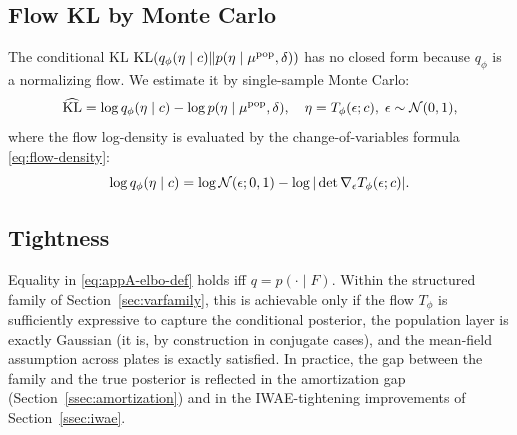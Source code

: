 \subsection*{Flow KL by Monte Carlo}
The conditional KL $\mathrm{KL}(q_\phi(\eta\mid c)\|p(\eta\mid\mu^{\mathrm{pop}},\delta))$ has no closed form because $q_\phi$ is a normalizing flow. We estimate it by single-sample Monte Carlo:
\begin{equation}
\widehat{\mathrm{KL}} = \log q_\phi(\eta\mid c) - \log p(\eta\mid \mu^{\mathrm{pop}},\delta),\quad \eta = T_\phi(\epsilon;c),\;\epsilon\sim\mathcal{N}(0,1),
\end{equation}
where the flow log-density is evaluated by the change-of-variables formula \eqref{eq:flow-density}:
\begin{equation}
\log q_\phi(\eta\mid c) = \log\mathcal{N}(\epsilon;0,1) - \log|\det\nabla_\epsilon T_\phi(\epsilon;c)|.
\end{equation}

\subsection*{Tightness}
Equality in \eqref{eq:appA-elbo-def} holds iff $q=p(\cdot\mid F)$. Within the structured family of Section~\ref{sec:varfamily}, this is achievable only if the flow $T_\phi$ is sufficiently expressive to capture the conditional posterior, the population layer is exactly Gaussian (it is, by construction in conjugate cases), and the mean-field assumption across plates is exactly satisfied. In practice, the gap between the family and the true posterior is reflected in the amortization gap (Section~\ref{ssec:amortization}) and in the IWAE-tightening improvements of Section~\ref{ssec:iwae}.
